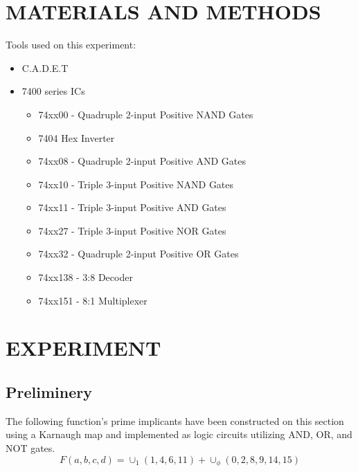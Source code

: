 \documentclass[pdftex,12pt,a4paper]{article}
\begin{document}
\section{MATERIALS AND METHODS}
Tools used on this experiment:
\begin{itemize}
    \item C.A.D.E.T
    \item 7400 series ICs
    \begin{itemize}
        \item 74xx00 - Quadruple 2-input Positive NAND Gates
        \item 7404 Hex Inverter
        \item 74xx08 - Quadruple 2-input Positive AND Gates
        \item 74xx10 - Triple 3-input Positive NAND Gates
        \item 74xx11 - Triple 3-input Positive AND Gates
        \item 74xx27 - Triple 3-input Positive NOR Gates
        \item 74xx32 - Quadruple 2-input Positive OR Gates
        \item 74xx138 - 3:8 Decoder
        \item 74xx151 - 8:1 Multiplexer
    \end{itemize}
\end{itemize}
\newpage

\section{EXPERIMENT}
\subsection{Preliminery}
The following function's prime implicants have been constructed on this section using a Karnaugh map and implemented as logic circuits utilizing AND, OR, and NOT gates.
\[F(a, b, c, d) = \cup_1(1, 4, 6, 11) + \cup_\phi(0, 2, 8, 9, 14, 15)\]
\end{document}
